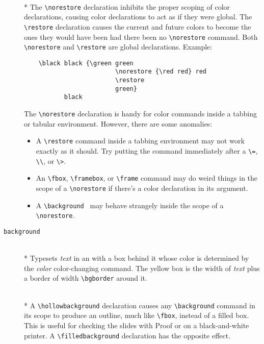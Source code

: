 \begin{description}
\item[{\tt
\begin{tabular}[b]{@{}l@{}}
 \bs norestore\\ 
 \bs restore
\end{tabular}}] \mbox{}\\*
The \verb+\norestore+ declaration inhibits the proper scoping of color
declarations, causing color declarations to act as if they were global.
The \verb+\restore+ declaration causes the current and future colors to
become the ones they would have been had there been no \verb+\norestore+
command.  Both \verb+\norestore+ and \verb+\restore+ are global declarations.
Example:
\begin{verbatim}
    \black black {\green green 
                         \norestore {\red red} red
                         \restore 
                         green} 
           black
\end{verbatim}     
The \verb+\norestore+ declaration is handy for color commands inside a
tabbing or tabular environment.  However, there are some anomalies:

\begin{itemize}
\item A \verb+\restore+ command inside a tabbing environment may not
work exactly as it should.  Try putting the command immediately after a
\verb+\=+, \verb+\\+, or \verb+\>+. 

\item An \verb+\fbox+, \verb+\framebox+, or \verb+\frame+ command may
do weird things in the scope of a \verb+\norestore+ if there's a color
declaration in its argument.
     
\item A \verb+\background + may behave strangely inside the scope of a
 \linebreak %
\verb+\norestore+.
\end{itemize}     

\item[{\tt \bs background\rb{}\rb }]
\mbox{}\\*
Typesets {\em text} in an \mbox with a box behind it whose color is
determined by the {\em color\/} color-changing command.  The yellow box
is the width of {\em text\/} plus a border of width \verb+\bgborder+
around it.  

\item[{\tt
\begin{tabular}[b]{@{}l@{}}
 \bs hollowbackground \\
 \bs filledbackground
\end{tabular}}] \mbox{}\\*
A \verb+\hollowbackground+ declaration causes any 
\verb+\background+
command in its scope to produce an outline, much like \verb+\fbox+,
instead of a filled box.  This is useful for checking the slides with
Proof or on a black-and-white printer.  A \verb+\filledbackground+
declaration has the opposite effect.  


\end{description}
